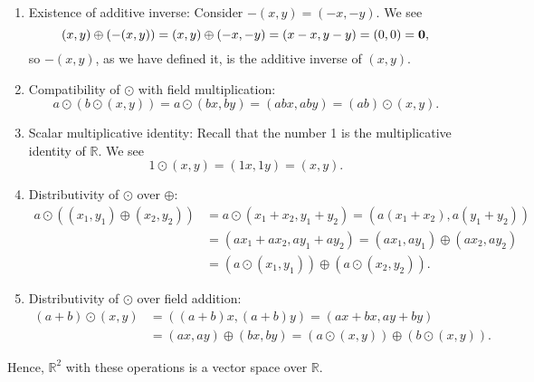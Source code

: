 \begin{sltn}
\begin{enumerate}
    \item Existence of additive inverse: Consider $ -(x,y)=(-x,-y) $. We see
    \begin{equation*}
        (x,y)\oplus(-(x,y))=(x,y)\oplus(-x,-y)=(x-x,y-y)=(0,0)=\boldsymbol{\mathbf{0}},
    \end{equation*}
    so $ -(x,y) $, as we have defined it, is the additive inverse of $ (x,y) $.

    \item Compatibility of $ \odot $ with field multiplication:
    \begin{equation*}
        a\odot(b\odot(x,y))=a\odot(bx,by)=(abx,aby)=(ab)\odot(x,y).
    \end{equation*}

    \item Scalar multiplicative identity: Recall that the number 1 is the multiplicative identity of $ \mathbb{R} $. We see
    \begin{equation*}
        1\odot(x,y)=(1x,1y)=(x,y).
    \end{equation*}

    \item\label{axiom:vect7} Distributivity of $ \odot $ over $ \oplus $:
    \begin{align*}
        a\odot((x_1,y_1)\oplus(x_2,y_2)) &= a\odot(x_1\!+x_2,y_1+y_2)=(a(x_1\!+x_2),a(y_1+y_2)) \\
        &= (ax_1\!+ax_2,ay_1+ay_2)=(ax_1,ay_1)\oplus(ax_2,ay_2) \\
        &= (a\odot(x_1,y_1))\oplus(a\odot(x_2,y_2)).
    \end{align*}

    \item\label{axiom:vect8} Distributivity of $ \odot $ over field addition:
    \begin{align*}
        (a+b)\odot(x,y) &= ((a+b)x,(a+b)y)=(ax+bx,ay+by) \\
        &= (ax,ay)\oplus(bx,by)=(a\odot(x,y))\oplus(b\odot(x,y)).
    \end{align*}
\end{enumerate}
Hence, $ \mathbb{R}^2 $ with these operations is a vector space over $ \mathbb{R} $.
\end{sltn}

